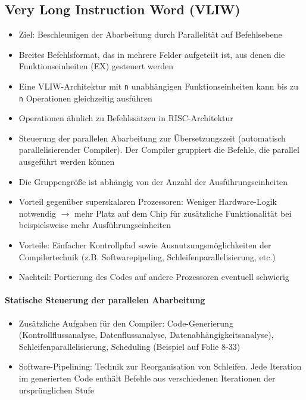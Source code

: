 	\subsection{Very Long Instruction Word (VLIW)}
		\begin{itemize}
			\item Ziel: Beschleunigen der Abarbeitung durch Parallelität auf Befehlsebene
			\item Breites Befehlsformat, das in mehrere Felder aufgeteilt ist, aus denen die Funktionseinheiten (EX) gesteuert werden
			\item Eine VLIW-Architektur mit \texttt{n} unabhängigen Funktionseinheiten kann bis zu \texttt{n} Operationen gleichzeitig ausführen
			\item Operationen ähnlich zu Befehlssätzen in RISC-Architektur
			\item Steuerung der parallelen Abarbeitung zur Übersetzungszeit (automatisch parallelisierender Compiler). Der Compiler gruppiert die Befehle, die parallel ausgeführt werden können
			\item Die Gruppengröße ist abhängig von der Anzahl der Ausführungseinheiten
			\item Vorteil gegenüber superskalaren Prozessoren: Weniger Hardware-Logik notwendig \(\rightarrow\) mehr Platz auf dem Chip für zusätzliche Funktionalität bei beispielsweise mehr Ausführungseinheiten
			\item Vorteile: Einfacher Kontrollpfad sowie Ausnutzungsmöglichkeiten der Compilertechnik (z.B. Softwarepipeling, Schleifenparallelisierung, etc.)
			\item Nachteil: Portierung des Codes auf andere Prozessoren eventuell schwierig
		\end{itemize}

		\paragraph{Statische Steuerung der parallelen Abarbeitung}
			\begin{itemize}
				\item Zusätzliche Aufgaben für den Compiler: Code-Generierung (Kontrollflussanalyse, Datenflussanalyse, Datenabhängigkeitsanalyse), Schleifenparallelisierung, Scheduling (Beispiel auf Folie 8-33)
				\item Software-Pipelining: Technik zur Reorganisation von Schleifen. Jede Iteration im generierten Code enthält Befehle aus verschiedenen Iterationen der ursprünglichen Stufe
			\end{itemize}


